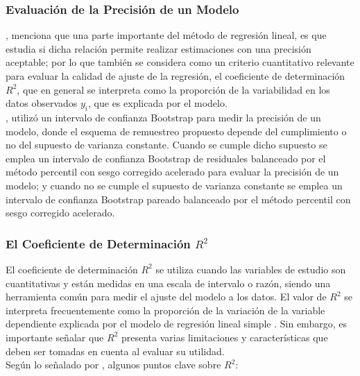 \subsubsection{Evaluación de la Precisión de un Modelo}

\textcite{zacarias-2023}, menciona que una parte importante del método de regresión lineal, es que estudia si dicha relación permite realizar estimaciones con una precisión aceptable; por lo que también se considera como un criterio cuantitativo relevante para evaluar la calidad de ajuste de la regresión, el coeficiente de determinación $R^{2}$, que en general se interpreta como la proporción de la variabilidad en los datos observados $y_{i}$, que es explicada por el modelo.\\


\textcite{balam-2012}, utilizó un intervalo de confianza Bootstrap para medir la precisión de un modelo, donde el esquema de remuestreo propuesto depende del cumplimiento o no del supuesto de varianza constante. Cuando se cumple dicho supuesto se emplea un intervalo de confianza Bootstrap de residuales balanceado por el método percentil con sesgo corregido acelerado para evaluar la precisión de un modelo; y cuando no se cumple el supuesto de varianza constante se emplea un intervalo de confianza Bootstrap pareado balanceado por el método percentil con sesgo corregido acelerado.\\

\subsubsection{El Coeficiente de Determinación $R^{2}$}

El coeficiente de determinación $R^{2}$ se utiliza cuando las variables de estudio son cuantitativas y están medidas en una escala de intervalo o razón, siendo una herramienta común para medir el ajuste del modelo a los datos. El valor de $R^{2}$
se interpreta frecuentemente como la proporción de la variación de la variable dependiente explicada por el modelo de regresión lineal simple \parencite{balam-2012}. Sin embargo, es importante señalar que $R^{2}$
presenta varias limitaciones y características que deben ser tomadas en cuenta al evaluar su utilidad.\\


Según lo señalado por \textcite{balam-2012}, algunos puntos clave sobre $R^{2}$:\\

